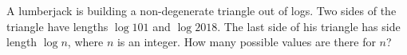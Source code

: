 A lumberjack is building a non-degenerate triangle out of logs. Two sides of the triangle have lengths $\log 101$ and $\log 2018$. The last side of his triangle has side length $\log n$, where $n$ is an integer. How many possible values are there for $n$?